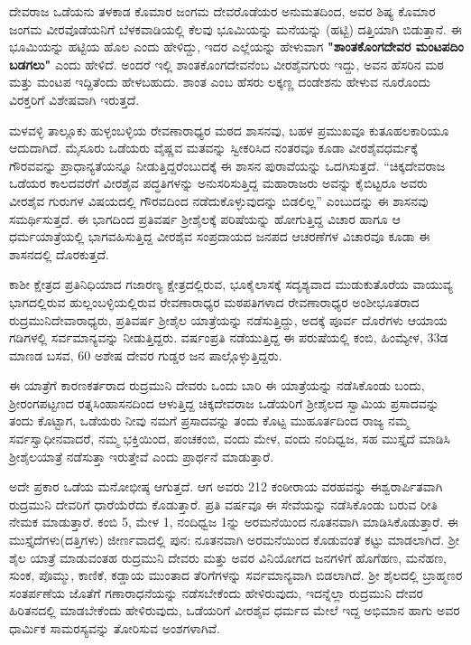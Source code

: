 ದೇವರಾಜ ಒಡೆಯನು ತಳಕಾಡ ಕೊಮಾರ ಜಂಗಮ ದೇವರೊಡೆಯರ ಅನುಮತದಿಂದ, ಅವರ ಶಿಷ್ಯ ಕೊಮಾರ ಜಂಗಮ ವೀರವೊಡೆಯನಿಗೆ ಬೆಳಕವಾಡಿಯಲ್ಲಿ ಕೆಲವು ಭೂಮಿಯನ್ನು ಮನೆಯನ್ನು (ಹಟ್ಟಿ) ದತ್ತಿಯಾಗಿ ಬಿಡುತ್ತಾನೆ. ಈ ಭೂಮಿಯನ್ನು ಹಟ್ಟಿಯ ಹೊಲ ಎಂದು ಹೇಳಿದ್ದು, ಇದರ ಎಲ್ಲೆಯನ್ನು ಹೇಳುವಾಗ \textbf{"ಶಾಂತಕೊಂಗದೇವರ ಮಂಟಪದಿಂ ಬಡಗಲು"} ಎಂದು ಹೇಳಿದೆ. ಅಂದರೆ ಇಲ್ಲಿ ಶಾಂತಕೊಂಗದೇವನೆಂಬ ವೀರಶೈವಗುರು ಇದ್ದು, ಅವನ ಹೆಸರಿನ ಮಠ ಮತ್ತು ಮಂಟಪ ಇದ್ದಿತೆಂದು ಹೇಳಬಹುದು. ಶಾಂತ ಎಂಬ ಹೆಸರು ಲಕ್ಕಣ್ಣ ದಂಡೇಶನು ಹೇಳುವ ನೂರೊಂದು ವಿರಕ್ತರಿಗೆ ವಿಶೇಷವಾಗಿ ಇರುತ್ತದೆ.

ಮಳವಳ್ಳಿ ತಾಲ್ಲೂಕು ಹುಳ್ಳಂಬಳ್ಳಿಯ ರೇವಣಾರಾಧ್ಯರ ಮಠದ ಶಾಸನವು, ಬಹಳ ಪ್ರಮುಖವೂ ಕುತೂಹಲಕಾರಿಯೂ ಆದುದಾಗಿದೆ. ಮೈಸೂರು ಒಡೆಯರು ವೈಷ್ಣವ ಮತವನ್ನು ಸ್ವೀಕರಿಸಿದ ನಂತರವೂ ಕೂಡಾ ವೀರಶೈವಧರ್ಮಕ್ಕೆ ಗೌರವವನ್ನು ಪ್ರಾಧಾನ್ಯತೆಯನ್ನೂ ನೀಡುತ್ತಿದ್ದರೆಂಬುದಕ್ಕೆ ಈ ಶಾಸನ ಪುರಾವೆಯನ್ನು ಒದಗಿಸುತ್ತದೆ. “ಚಿಕ್ಕದೇವರಾಜ ಒಡೆಯರ ಕಾಲದವರೆಗೆ ವೀರಶೈವ ಪದ್ಧತಿಗಳನ್ನು ಅನುಸರಿಸುತ್ತಿದ್ದ ಮಹಾರಾಜರು ಅವನ್ನು ಕೈಬಿಟ್ಟರೂ ಅವರು ವೀರಶೈವ ಗುರುಗಳ ವಿಷಯದಲ್ಲಿ ಗೌರವದಿಂದ ನಡೆದುಕೊಳ್ಳುವುದನ್ನು ಬಿಡಲಿಲ್ಲ” ಎಂಬುದನ್ನು ಈ ಶಾಸನವು ಸಮರ್ಥಿಸುತ್ತದೆ. ಈ ಭಾಗದಿಂದ ಪ್ರತಿವರ್ಷ ಶ‍್ರೀಶೈಲಕ್ಕೆ ಪರಿಷೆಯನ್ನು ಹೋಗುತ್ತಿದ್ದ ವಿಚಾರ ಹಾಗೂ ಆ ಧರ್ಮಯಾತ್ರೆಯಲ್ಲಿ ಭಾಗವಹಿಸುತ್ತಿದ್ದ ವೀರಶೈವ ಸಂಪ್ರದಾಯದ ಜನಪದ ಆಚರಣೆಗಳ ವಿಚಾರವೂ ಕೂಡಾ ಈ ಶಾಸನದಲ್ಲಿ ದೊರಕುತ್ತದೆ.

ಕಾಶೀ ಕ್ಷೇತ್ರದ ಪ್ರತಿನಿಧಿಯಾದ ಗಜಾರಣ್ಯ ಕ್ಷೇತ್ರದಲ್ಲಿರುವ, ಭೂಕೈಲಾಸಕ್ಕೆ ಸದೃಶ್ಯವಾದ ಮುಡುಕುತೊರೆಯ ವಾಯುವ್ಯ ಭಾಗದಲ್ಲಿರುವ ಹುಲ್ಲಂಬಳ್ಳಿಯಲ್ಲಿರುವ ರೇವಣಾರಾಧ್ಯರ ಮಠಪತಿಗಳಾದ ರೇವಣಾರಾಧ್ಯರ ಅಂಶೀಭೂತರಾದ ರುದ್ರಮುನಿದೇವಾರಾಧ್ಯರು, ಪ್ರತಿವರ್ಷ ಶ‍್ರೀಶೈಲ ಯಾತ್ರೆಯನ್ನು ನಡೆಸುತ್ತಿದ್ದು, ಅದಕ್ಕೆ ಪೂರ್ವ ದೊರೆಗಳು ಆಯಾಯ ಗಡಿಗಳಲ್ಲಿ ಸರ್ವಮಾನ್ಯವನ್ನು ನೀಡುತ್ತಿದ್ದರು. ವರ್ಷಂಪ್ರತಿ ನಡೆಯುತ್ತಿದ್ದ ಈ ಪರುಷೆಯಲ್ಲಿ ಕಂಬಿ, ಹಿಂಮ್ಯೇಳ, 33ಡ ಮಾಣಡ ಬಸವ, 60 ಅಶೇಷ ದೇವರ ಗುಡ್ಡರ ಜನ ಪಾಲ್ಗೊಳ್ಳುತ್ತಿದ್ದರು.

ಈ ಯಾತ್ರೆಗೆ ಕಾರಣಕರ್ತರಾದ ರುದ್ರಮುನಿ ದೇವರು ಒಂದು ಬಾರಿ ಈ ಯಾತ್ರೆಯನ್ನು ನಡೆಸಿಕೊಂಡು ಬಂದು, ಶ‍್ರೀರಂಗಪಟ್ಟಣದ ರತ್ನಸಿಂಹಾಸನದಿಂದ ಆಳುತ್ತಿದ್ದ ಚಿಕ್ಕದೇವರಾಜ ಒಡೆಯರಿಗೆ ಶ‍್ರೀಶೈಲದ ಸ್ವಾಮಿಯ ಪ್ರಸಾದವನ್ನು ತಂದು ಕೊಟ್ಟಾಗ, ಒಡೆಯರು ನೀವು ನಮಗೆ ಪ್ರಸಾದವನ್ನು ತಂದು ಕೊಟ್ಟ ಮುಹೂರ್ತದಿಂದ ರಾಜ್ಯ ನಮ್ಮ ಸರ್ವಸ್ವಾಧೀನವಾದರೆ, ನಮ್ಮ ಭಕ್ತಿಯಿಂದ, ಪಂಚಕಂಬಿ, ವಂದು ಮೇಳ, ವಂದು ನಂದಿಧ್ವಜ, ಸಹ ಮುಸ್ತೈದೆ ಮಾಡಿಸಿ ಶ‍್ರೀಶೈಲಯಾತ್ರೆ ನಡೆಸುತ್ತಾ ಇರುತ್ತೇವೆ ಎಂದು ಪ್ರಾರ್ಥನೆ ಮಾಡುತ್ತಾರೆ.

ಅದೇ ಪ್ರಕಾರ ಒಡೆಯ ಮನೋಭೀಷ್ಠ ಆಗುತ್ತದೆ. ಆಗ ಅವರು 212 ಕಂಠೀರಾಯ ವರಹವನ್ನು ಈಶ್ವರಾರ್ಪಿತವಾಗಿ ರುದ್ರಮುನಿ ದೇವರಿಗೆ ಧಾರೆಯೆರೆದು ಕೊಡುತ್ತಾರೆ. ಪ್ರತಿ ವರ್ಷವೂ ಈ ಸೇವೆಯನ್ನು ನಡೆಸಿಕೊಂಡು ಬರುವ ರೀತಿ ನೇಮಕ ಮಾಡುತ್ತಾರೆ. ಕಂಬಿ 5, ಮೇಳ 1, ನಂದಿಧ್ವಜ 1ನ್ನು ಅರಮನೆಯಿಂದ ನೂತನವಾಗಿ ಮಾಡಿಸಿಕೊಡುತ್ತಾರೆ. ಈ ಮುಸ್ತೈದೆ\-ಗಳು(ದತ್ತಿಗಳು) ಜೀರ್ಣವಾದಲ್ಲಿ ಪುನ: ನೂತನವಾಗಿ ಅರಮನೆಯಿಂದ ಕೊಡುವಂತೆ ಕಟ್ಟು ಮಾಡಲಾಗಿದೆ. ಶ‍್ರೀ ಶೈಲ ಯಾತ್ರೆ ಮಾಡುವಂತಹ ರುದ್ರಮುನಿ ದೇವರು ಮತ್ತು ಅವರ ವಿನಿಯೋಗದ ಜನಗಳಿಗೆ ಹೊಗೆಹಣ, ಮನೆಹಣ, ಸುಂಕ, ಪೊಮ್ಮು, ಕಾಣಿಕೆ, ಕಡ್ಡಾಯ ಮುಂತಾದ ತೆರಿಗೆಗಳನ್ನು ಸರ್ವಮಾನ್ಯವಾಗಿ ಬಿಡಲಾಗಿದೆ. ಶ‍್ರೀ ಶೈಲದಲ್ಲಿ ಬ್ರಾಹ್ಮಣರ ಸಂತರ್ಪಣೆಯ ಜೊತೆಗೆ ಗಣಾರಾಧನೆಯನ್ನು ನಡೆಸಬೇಕೆಂದು ಹೇಳಿರುವುದು, ಇದನ್ನೆಲ್ಲಾ ರುದ್ರಮುನಿ ದೇವರ ಹಿರಿತನದಲ್ಲಿ ಮಾಡಬೇಕೆಂದು ಹೇಳಿರುವುದು, ಒಡೆಯರಿಗೆ ವೀರಶೈವ ಧರ್ಮದ ಮೇಲೆ ಇದ್ದ ಅಭಿಮಾನ ಹಾಗು ಅವರ ಧಾರ್ಮಿಕ ಸಾಮರಸ್ಯವನ್ನು ತೋರಿಸುವ ಅಂಶಗಳಾಗಿವೆ.


